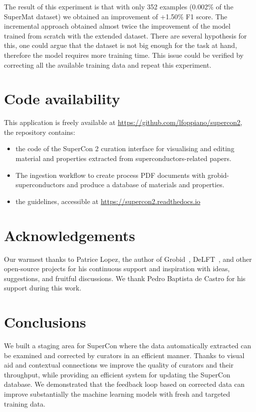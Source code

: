 \documentclass[a4paper]{article}
\begin{document}
The result of this experiment is that with only 352 examples (0.002\% of the SuperMat dataset) we obtained an improvement of +1.50\% F1 score. The incremental approach obtained almost twice the improvement of the model trained from scratch with the extended dataset. 
There are several hypothesis for this, one could argue that the dataset is not big enough for the task at hand, therefore the model requires more training time. This issue could be verified by correcting all the available training data and repeat this experiment. 


\section{Code availability}
This application is freely available at \url{https://github.com/lfoppiano/supercon2}, the repository contains:
\begin{itemize}
\item the code of the SuperCon 2 curation interface for visualising and editing material and properties extracted from superconductors-related papers.
\item The ingestion workflow to create process PDF documents with grobid-superconductors and produce a database of materials and properties.
\item the guidelines, accessible at \url{https://supercon2.readthedocs.io}
\end{itemize}

\section{Acknowledgements}
Our warmest thanks to Patrice Lopez, the author of Grobid~\cite{GROBID}, DeLFT~\cite{DeLFT}, and other open-source projects for his continuous support and inspiration with ideas, suggestions, and fruitful discussions.
We thank Pedro Baptista de Castro for his support during this work. 

\section{Conclusions}
We built a staging area for SuperCon where the data automatically extracted can be examined and corrected by curators in an efficient manner. Thanks to visual aid and contextual connections we improve the quality of curators and their throughput, while providing an efficient system for updating the SuperCon database. 
We demonstrated that the feedback loop based on corrected data can improve substantially the machine learning models with fresh and targeted training data. 
\end{document}
